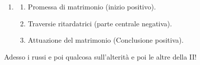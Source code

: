 \begin{enumerate}
\def\labelenumi{(\arabic{enumi})}
\setcounter{enumi}{1}
\item
  \begin{enumerate}
  \def\labelenumii{(\roman{enumii})}
  \tightlist
  \item
    Promessa di matrimonio (inizio positivo).
  \item
    Traversie ritardatrici (parte centrale negativa).
  \item
    Attuazione del matrimonio (Conclusione positiva).
  \end{enumerate}
\end{enumerate}

Adesso i russi e poi qualcosa sull'alterità e poi le altre della II!
